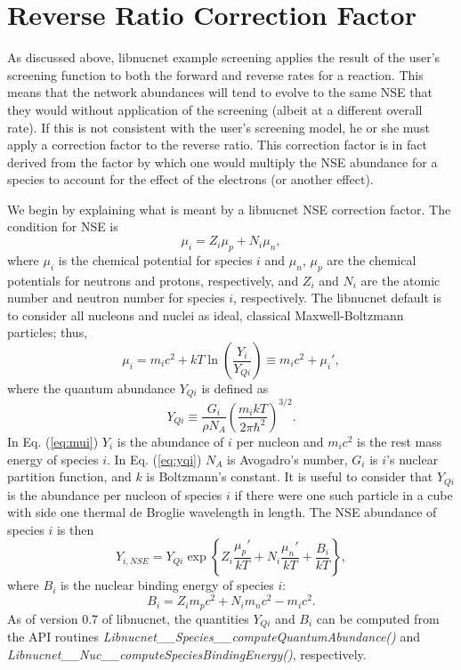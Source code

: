 \documentclass{article}    %
\begin{document}
\section{Reverse Ratio Correction Factor}

As discussed above, libnucnet example
screening applies the result of the user's screening
function to both the forward and reverse rates for a reaction.  This means
that the network abundances will tend to evolve to the same NSE that they
would without application of the screening (albeit at a different overall
rate).  If this is not consistent with the user's screening model, he or she
must apply a correction factor to the reverse ratio.  This correction factor
is in fact derived from the
factor by which one would multiply the NSE abundance for
a species to account for the effect of the electrons (or another effect).

We begin by explaining
what is meant by a libnucnet NSE correction factor.
The condition for
NSE is
\begin{equation}
\mu_i = Z_i \mu_p + N_i \mu_n, \label{eq:nse_condition}
\end{equation}
where $\mu_i$ is the chemical potential for species $i$ and $\mu_n$, $\mu_p$
are the chemical potentials for neutrons and protons, respectively, and
$Z_i$ and $N_i$ are the atomic number and neutron number for species $i$, 
respectively.  The libnucnet default is to consider all nucleons and nuclei
as ideal, classical Maxwell-Boltzmann particles; thus,
\begin{equation}
\mu_i = m_i c^2 + kT \ln\left(\frac{Y_i}{Y_{Qi}}\right)
\equiv m_i c^2 + \mu_i',\label{eq:classical_mu}
\label{eq:mui}
\end{equation}
where the quantum abundance $Y_{Qi}$ is defined as
\begin{equation}
Y_{Qi} \equiv \frac{G_i}{\rho N_A}
\left(\frac{m_i kT}{2\pi\hbar^2}\right)^{3/2}.
\label{eq:yqi}
\end{equation}
In Eq. (\ref{eq:mui}) $Y_i$ is the abundance of $i$ per nucleon and
$m_ic^2$ is the rest mass energy of species $i$.
In Eq. (\ref{eq:yqi})
$N_A$ is Avogadro's number,
$G_i$ is $i$'s nuclear partition function, and $k$ is Boltzmann's constant.
It is useful to consider that $Y_{Qi}$ is the abundance per nucleon of species
$i$ if there were one such particle in a cube with side
one thermal de Broglie wavelength in length.
The NSE abundance of species $i$ is then
\begin{equation}
Y_{i,NSE} = Y_{Qi}\exp\left\{Z_i \frac{\mu_p'}{kT} + N_i \frac{\mu_n'}{kT}
+ \frac{B_i}{kT}\right\}, \label{eq:y_i_nse}
\end{equation}
where $B_i$ is the nuclear binding energy of species $i$:
\begin{equation}
B_i = Z_i m_pc^2 + N_i m_nc^2 - m_ic^2.\label{eq:binding}
\end{equation}
As of version 0.7 of libnucnet, the quantities $Y_{Qi}$ and $B_i$ can be
computed from the API routines
{\em Libnucnet\_\_Species\_\_computeQuantumAbundance()}
and
{\em Libnucnet\_\_Nuc\_\_computeSpeciesBindingEnergy()},
respectively.
\end{document}
